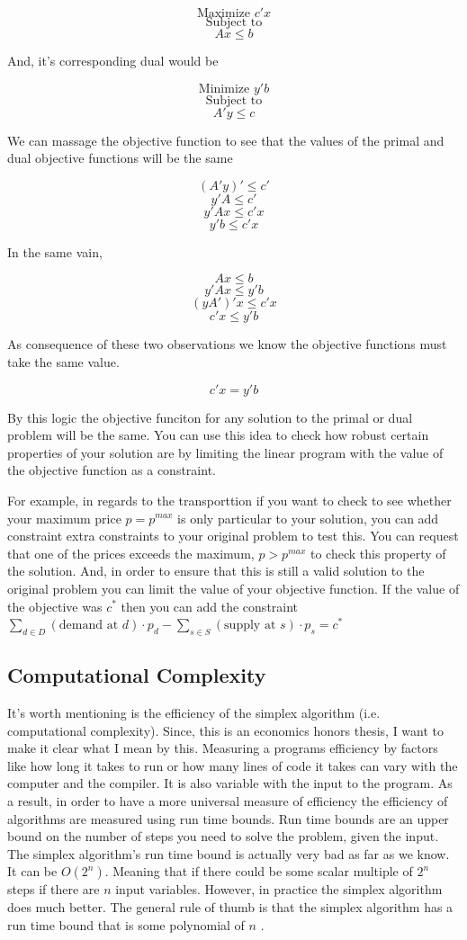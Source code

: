\documentclass{report}
\begin{document}
$$\text{Maximize } c' x$$
$$\text{Subject to}$$
$$Ax \leq b$$

And, it's corresponding dual would be

$$\text{Minimize } y' b$$
$$\text{Subject to}$$
$$A'y \leq c$$

We can massage the objective function to see that the values of the primal and dual objective functions will be the same

$$(A'y)' \leq c'$$
$$ y'A \leq c'$$
$$ y'Ax \leq c'x$$
$$y' b \leq c'x$$

In the same vain, 

$$ Ax \leq b$$
$$ y'Ax \leq y'b$$
$$ (yA')'x \leq c'x$$
$$ c'x \leq  y' b $$

As consequence of these two observations we know the objective functions must take the same value.

$$c'x = y' b$$

By this logic the objective funciton for any solution to the primal or dual problem will be the same. You can use this idea to check how robust certain properties of your solution are by limiting the linear program with the value of the objective function as a constraint. 

For example, in regards to the transporttion if you want to check to see whether your maximum price $p = p^{max}$ is only particular to your solution, you can add constraint extra constraints to your original problem to test this. You can request that one of the prices exceeds the maximum, $p > p^{max}$ to check this property of the solution. And, in order to ensure that this is still a valid solution to the original problem you can limit the value of your objective function. If the value of the objective was $c^*$ then you can add the constraint  $ \sum_{d \in D}  (\text{demand at } d) \cdot p_{d} -   \sum_{s \in S}  (\text{supply at } s) \cdot p_{s} = c^*$
 
\subsection{Computational Complexity}
It's worth mentioning is the efficiency of the simplex algorithm (i.e. computational complexity). Since, this is an economics honors thesis, I want to make it clear what I mean by this. Measuring a programs efficiency by factors like how long it takes to run or how many lines of code it takes can vary with the computer and the compiler. It is also variable with the input to the program. As a result, in order to have a more universal measure of efficiency the efficiency of algorithms are measured using run time bounds. Run time bounds are an upper bound on the number of steps you need to solve the problem, given the input. The simplex algorithm's run time bound is actually very bad as far as we know. It can be $O(2^n)$. Meaning that if there could be some scalar multiple of $2^n$ steps if there are $n$ input variables. However, in practice the simplex algorithm does much better. The general rule of thumb is that the simplex algorithm has a run time bound that is some polynomial of $n$ \cite{Cook}.
\end{document}
